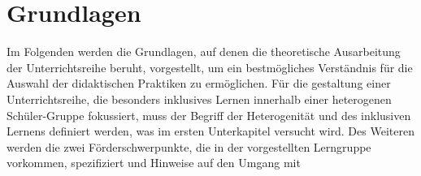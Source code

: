 \documentclass[12pt]{article}
\begin{document}
\section{Grundlagen}
Im Folgenden werden die Grundlagen, auf denen die theoretische Ausarbeitung der Unterrichtsreihe beruht, vorgestellt, um ein bestmögliches Verständnis für die Auswahl der didaktischen Praktiken zu ermöglichen. Für die gestaltung einer Unterrichtsreihe, die besonders inklusives Lernen innerhalb einer heterogenen Schüler-Gruppe fokussiert, muss der Begriff der Heterogenität und des inklusiven Lernens definiert werden, was im ersten Unterkapitel versucht wird. Des Weiteren werden die zwei Förderschwerpunkte, die in der vorgestellten Lerngruppe vorkommen, spezifiziert und Hinweise auf den Umgang mit 


\vspace{0.8cm}




\newpage
\printbibliography[heading=bibintoc]
\pagestyle{empty}
\end{document}
